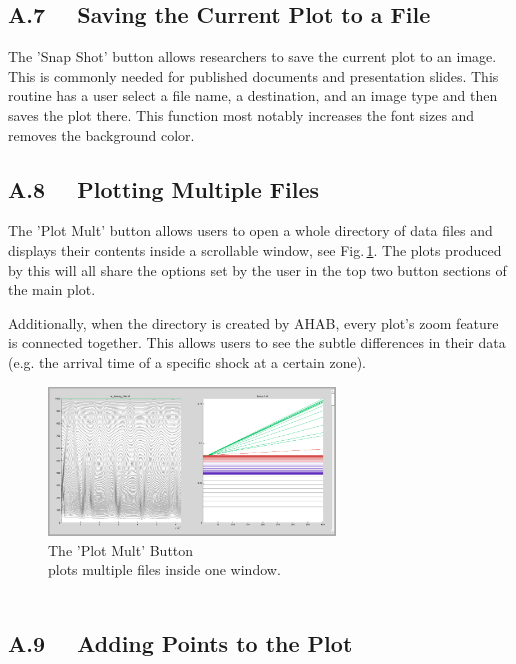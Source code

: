 \subsection{A.7 \ \ Saving the Current Plot to a File }

The 'Snap Shot' button allows researchers to save the current plot to an image.  This is commonly needed for published documents and presentation slides.  This routine has a user select a file name, a destination, and an image type and then saves the plot there.  This function most notably increases the font sizes and removes the background color. 


\subsection{A.8 \ \ Plotting Multiple Files }

The 'Plot Mult' button allows users to open a whole directory of data files and displays their contents inside a scrollable window, see Fig.\,\ref{fig:plotMult}.  The plots produced by this will all share the options set by the user in the top two button sections of the main plot.  

Additionally, when the directory is created by AHAB, every plot's zoom feature is connected together.  This allows users to see the subtle differences in their data (e.g. the arrival time of a specific shock at a certain zone). 

\begin{figure}[h!]	
	\centering
	\includegraphics[width=0.68\textwidth]{graphics/plotMult.png} 
	\caption[Plotting Multiple Files]{  The 'Plot Mult' Button \\ \textmd{plots multiple files inside one window. \\ } \tiny{\phantom \\ \phantom} } 
	\label{fig:plotMult}
\end{figure}

\subsection{A.9 \ \ Adding Points to the Plot }

